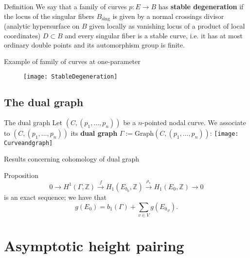 \documentclass{beamer}
\newcommand{\numberset}{\mathbb}
\newcommand{\Z}{\numberset{Z}}
\begin{document}
\begin{frame}{Definition}
	We say that a family of curves $p\colon E \rightarrow B$ has \textbf{stable degeneration} if the locus of the singular fibers $B_{\text{sing}}$ is given by a normal crossings divisor (analytic hypersurface on $B$ given locally as vanishing locus of a product of local coordinates) $D \subset B$ and every singular fiber is a stable curve, i.e. it has at most ordinary double points and its automorphism group is finite.
\end{frame}

\begin{frame}{Example of family of curves at one-parameter}
\begin{figure}
\centering
\texttt{[image: StableDegeneration]}
\end{figure}
\end{frame}

\subsection{The dual graph}
\begin{frame}{The dual graph}
Let $(C,(p_1, \dots,p_n))$ be a $n$-pointed nodal curve. We associate to $(C,(p_1,\dots,p_n))$ its \textbf{dual graph} $\Gamma := \text{Graph}(C,(p_1,\dots,p_n))$:\vspace{1 em}
\centering
\texttt{[image: Curveandgraph]}
\end{frame}

\begin{frame}{Results concerning cohomology of dual graph}
\begin{block}{Proposition}
$$0 \rightarrow H^1(\Gamma,\Z) \stackrel{f}{\longrightarrow} H_1(E_{b_0},\Z) \stackrel{\rho_*}{\longrightarrow} H_1(E_0,\Z) \rightarrow 0$$ is an exact sequence; we have that
 $$g(E_0) = b_1(\Gamma) + \sum_{v \in V} g({E_0}_v).$$
\end{block}
\end{frame}

\section{Asymptotic height pairing}
\end{document}
